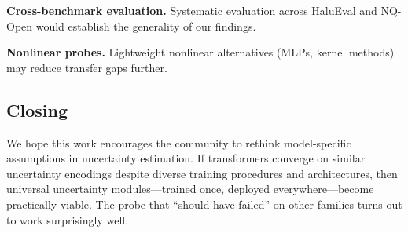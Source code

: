 \textbf{Cross-benchmark evaluation.} Systematic evaluation across HaluEval and NQ-Open would establish the generality of our findings.

\textbf{Nonlinear probes.} Lightweight nonlinear alternatives (MLPs, kernel methods) may reduce transfer gaps further.

\subsection{Closing}

We hope this work encourages the community to rethink model-specific assumptions in uncertainty estimation. If transformers converge on similar uncertainty encodings despite diverse training procedures and architectures, then universal uncertainty modules---trained once, deployed everywhere---become practically viable. The probe that ``should have failed'' on other families turns out to work surprisingly well.
